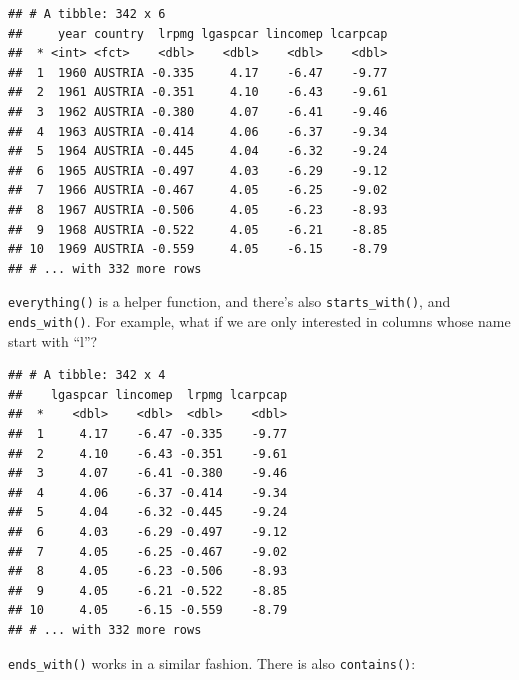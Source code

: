 \documentclass[]{gitbook}
\newenvironment{Shaded}{\begin{snugshade}}{\end{snugshade}}
\newcommand{\KeywordTok}[1]{\textcolor[rgb]{0.13,0.29,0.53}{\textbf{#1}}}
\newcommand{\NormalTok}[1]{#1}
\newcommand{\OperatorTok}[1]{\textcolor[rgb]{0.81,0.36,0.00}{\textbf{#1}}}
\newcommand{\StringTok}[1]{\textcolor[rgb]{0.31,0.60,0.02}{#1}}
\theoremstyle{definition}
\theoremstyle{definition}
\theoremstyle{definition}
\theoremstyle{remark}
\begin{document}
\begin{verbatim}
## # A tibble: 342 x 6
##     year country  lrpmg lgaspcar lincomep lcarpcap
##  * <int> <fct>    <dbl>    <dbl>    <dbl>    <dbl>
##  1  1960 AUSTRIA -0.335     4.17    -6.47    -9.77
##  2  1961 AUSTRIA -0.351     4.10    -6.43    -9.61
##  3  1962 AUSTRIA -0.380     4.07    -6.41    -9.46
##  4  1963 AUSTRIA -0.414     4.06    -6.37    -9.34
##  5  1964 AUSTRIA -0.445     4.04    -6.32    -9.24
##  6  1965 AUSTRIA -0.497     4.03    -6.29    -9.12
##  7  1966 AUSTRIA -0.467     4.05    -6.25    -9.02
##  8  1967 AUSTRIA -0.506     4.05    -6.23    -8.93
##  9  1968 AUSTRIA -0.522     4.05    -6.21    -8.85
## 10  1969 AUSTRIA -0.559     4.05    -6.15    -8.79
## # ... with 332 more rows
\end{verbatim}

\texttt{everything()} is a helper function, and there's also
\texttt{starts\_with()}, and \texttt{ends\_with()}. For example, what if
we are only interested in columns whose name start with ``l''?

\begin{Shaded}
\end{Shaded}

\begin{verbatim}
## # A tibble: 342 x 4
##    lgaspcar lincomep  lrpmg lcarpcap
##  *    <dbl>    <dbl>  <dbl>    <dbl>
##  1     4.17    -6.47 -0.335    -9.77
##  2     4.10    -6.43 -0.351    -9.61
##  3     4.07    -6.41 -0.380    -9.46
##  4     4.06    -6.37 -0.414    -9.34
##  5     4.04    -6.32 -0.445    -9.24
##  6     4.03    -6.29 -0.497    -9.12
##  7     4.05    -6.25 -0.467    -9.02
##  8     4.05    -6.23 -0.506    -8.93
##  9     4.05    -6.21 -0.522    -8.85
## 10     4.05    -6.15 -0.559    -8.79
## # ... with 332 more rows
\end{verbatim}

\texttt{ends\_with()} works in a similar fashion. There is also
\texttt{contains()}:

\begin{Shaded}
\end{Shaded}
\end{document}
